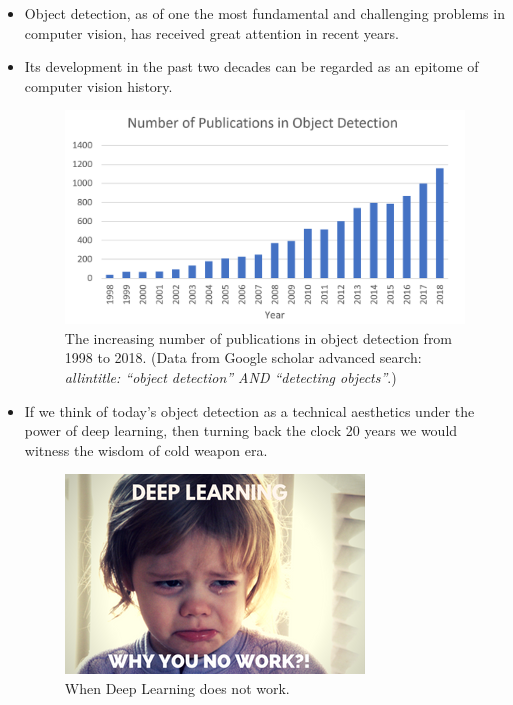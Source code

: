 \documentclass{beamer}
\begin{document}
\begin{frame}
    \begin{itemize}[<+-| alert@+>]
        \item Object detection, as of one the most fundamental and challenging problems in computer vision, has received great attention in recent years. 
        \item Its development in the past two decades can be regarded as an epitome of computer vision history. 
       \begin{figure}[h!]
                \begin{center}
                    \includegraphics[width=0.7\linewidth]{number-of-papers.png}
                    \caption{\small The increasing number of publications in object detection from 1998 to 2018. (Data from Google scholar advanced search: \textit{allintitle: ``object detection'' AND ``detecting objects''}.)}
                \end{center}
        \end{figure}
        
    \end{itemize}

\end{frame}
%        
\begin{frame}
    \begin{itemize}
        \item If we think of today's object detection as a technical aesthetics under the power of deep learning, then turning back the clock 20 years we would witness the wisdom of cold weapon era. 
        \begin{figure}[h!]
            \begin{center}
                \includegraphics[width=0.7\linewidth]{memedeeplearning.png}
                \caption{\small When Deep Learning does not work.}
            \end{center}
        \end{figure}
        
    \end{itemize}
\end{frame}
\end{document}
